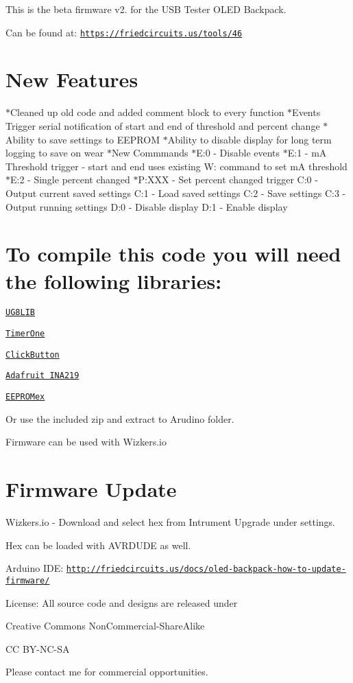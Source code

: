 This is the beta firmware v2. for the U\+SB Tester O\+L\+ED Backpack.

Can be found at\+: \href{https://friedcircuits.us/tools/46}{\tt https\+://friedcircuits.\+us/tools/46}

\section*{New Features }

$\ast$\+Cleaned up old code and added comment block to every function $\ast$\+Events Trigger serial notification of start and end of threshold and percent change $\ast$\+Ability to save settings to E\+E\+P\+R\+OM $\ast$\+Ability to disable display for long term logging to save on wear $\ast$\+New Commmands $\ast$E\+:0 -\/ Disable events $\ast$E\+:1 -\/ mA Threshold trigger -\/ start and end uses existing W\+: command to set mA threshold $\ast$E\+:2 -\/ Single percent changed $\ast$P\+:X\+XX -\/ Set percent changed trigger C\+:0 -\/ Output current saved settings C\+:1 -\/ Load saved settings C\+:2 -\/ Save settings C\+:3 -\/ Output running settings D\+:0 -\/ Disable display D\+:1 -\/ Enable display

\section*{To compile this code you will need the following libraries\+: }

\href{https://github.com/olikraus/u8glib}{\tt U\+G8\+L\+IB}

\href{https://code.google.com/p/arduino-timerone/}{\tt Timer\+One}

\href{http://code.google.com/p/clickbutton/}{\tt Click\+Button}

\href{https://github.com/adafruit/Adafruit_INA219}{\tt Adafruit I\+N\+A219}

\href{https://github.com/thijse/Arduino-EEPROMEx}{\tt E\+E\+P\+R\+O\+Mex}

Or use the included zip and extract to Arudino folder.

Firmware can be used with Wizkers.\+io

\section*{Firmware Update }

Wizkers.\+io -\/ Download and select hex from Intrument Upgrade under settings.

Hex can be loaded with A\+V\+R\+D\+U\+DE as well.

Arduino I\+DE\+: \href{http://friedcircuits.us/docs/oled-backpack-how-to-update-firmware/}{\tt http\+://friedcircuits.\+us/docs/oled-\/backpack-\/how-\/to-\/update-\/firmware/}

License\+: All source code and designs are released under

Creative Commons Non\+Commercial-\/\+Share\+Alike

CC B\+Y-\/\+N\+C-\/\+SA



Please contact me for commercial opportunities. 